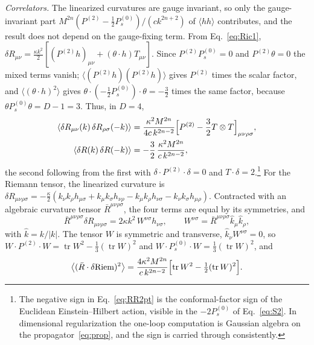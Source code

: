 \documentclass[a4paper,11pt]{article}
\newcommand{\Pt}{P^{(2)}}
\newcommand{\Ps}{P^{(0)}_{s}}
\newcommand{\Riem}{\mathrm{Riem}}
\begin{document}
\textit{Correlators.} The linearized curvatures are gauge invariant, so only the gauge-invariant part $M^{2n}(\Pt-\frac12\Ps)/(ck^{2n+2})$ of $\langle hh\rangle$ contributes, and the result does not depend on the gauge-fixing term. From Eq.~\eqref{eq:Ric1}, $\delta R_{\mu\nu}=\frac{\kappa k^2}2[(\Pt h)_{\mu\nu}+(\theta\cdot h)T_{\mu\nu}]$. Since $\Pt\Ps=0$ and $\Pt\theta=0$ the mixed terms vanish; $\langle(\Pt h)(\Pt h)\rangle$ gives $\Pt$ times the scalar factor, and $\langle(\theta\cdot h)^2\rangle$ gives $\theta\cdot(-\frac12\Ps)\cdot\theta=-\frac32$ times the same factor, because $\theta\Ps\theta=D-1=3$. Thus, in $D=4$,
\begin{align}
\langle\delta R_{\mu\nu}(k)\,\delta R_{\rho\sigma}(-k)\rangle&=\frac{\kappa^2M^{2n}}{4c\,k^{2n-2}}\Bigl[\Pt-\frac32T\otimes T\Bigr]_{\mu\nu\rho\sigma},\label{eq:RicRic2pt}\\
\langle\delta R(k)\,\delta R(-k)\rangle&=-\frac32\,\frac{\kappa^2M^{2n}}{c\,k^{2n-2}},\label{eq:RR2pt}
\end{align}
the second following from the first with $\delta\cdot\Pt\cdot\delta=0$ and $T\cdot\delta=2$.\footnote{The negative sign in Eq.~\eqref{eq:RR2pt} is the conformal-factor sign of the Euclidean Einstein--Hilbert action, visible in the $-2\Ps$ of Eq.~\eqref{eq:S2}. In dimensional regularization the one-loop computation is Gaussian algebra on the propagator~\eqref{eq:prop}, and the sign is carried through consistently.} For the Riemann tensor, the linearized curvature is $\delta R_{\mu\nu\rho\sigma}=-\frac\kappa2(k_\nu k_\rho h_{\mu\sigma}+k_\mu k_\sigma h_{\nu\rho}-k_\mu k_\rho h_{\nu\sigma}-k_\nu k_\sigma h_{\mu\rho})$. Contracted with an algebraic curvature tensor $\bar R^{\mu\nu\rho\sigma}$, the four terms are equal by its symmetries, and
\begin{equation}
\label{eq:RiemW}
\bar R^{\mu\nu\rho\sigma}\delta R_{\mu\nu\rho\sigma}=2\kappa k^2\,W^{\nu\sigma}h_{\nu\sigma},\qquad W^{\nu\sigma}=\bar R^{\mu\nu\rho\sigma}\hat k_\mu\hat k_\rho ,
\end{equation}
with $\hat k=k/|k|$. The tensor $W$ is symmetric and transverse, $\hat k_\nu W^{\nu\sigma}=0$, so $W\cdot\Pt\cdot W=\operatorname{tr}W^2-\frac13(\operatorname{tr}W)^2$ and $W\cdot\Ps\cdot W=\frac13(\operatorname{tr}W)^2$, and
\begin{equation}
\label{eq:RiemRiem2pt}
\bigl\langle(\bar R\cdot\delta\Riem)^2\bigr\rangle=\frac{4\kappa^2M^{2n}}{c\,k^{2n-2}}\Bigl[\operatorname{tr}W^2-\tfrac12(\operatorname{tr}W)^2\Bigr].
\end{equation}
\end{document}
